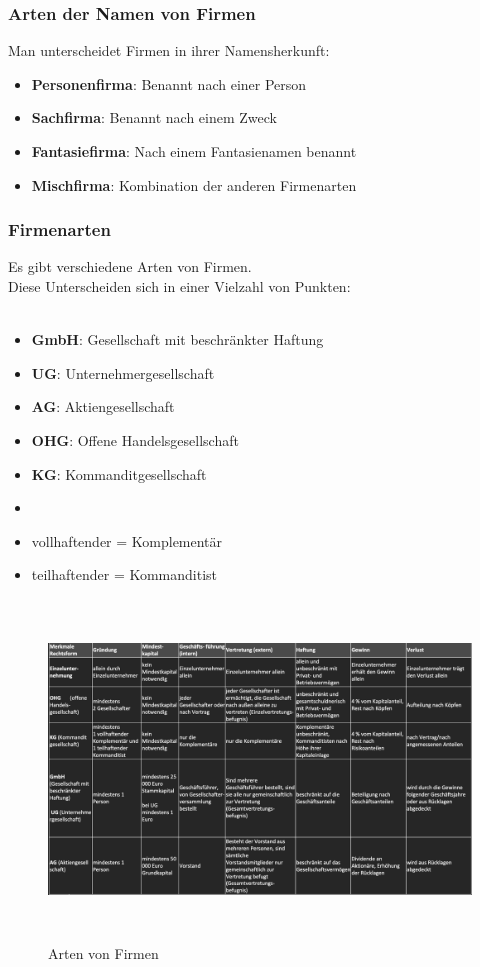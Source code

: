 \documentclass[10pt]{article}
\begin{document}
\subsubsection{Arten der Namen von Firmen}
Man unterscheidet Firmen in ihrer Namensherkunft:
\begin{itemize}
\item \textbf{Personenfirma}: Benannt nach einer Person
\item \textbf{Sachfirma}: Benannt nach einem Zweck
\item \textbf{Fantasiefirma}: Nach einem Fantasienamen benannt
\item \textbf{Mischfirma}: Kombination der anderen Firmenarten
\end{itemize}

\subsubsection{Firmenarten}
Es gibt verschiedene Arten von Firmen. \\
Diese Unterscheiden sich in einer Vielzahl von Punkten: \\ \\

\begin{itemize}
\item \textbf{GmbH}: Gesellschaft mit beschr\"ankter Haftung
\item \textbf{UG}: Unternehmergesellschaft
\item \textbf{AG}: Aktiengesellschaft
\item \textbf{OHG}: Offene Handelsgesellschaft
\item \textbf{KG}: Kommanditgesellschaft
\item[]
\item vollhaftender = Komplement\"ar
\item teilhaftender = Kommanditist
\end{itemize}

\begin{figure}[H]
\begin{center}
  \includegraphics[height=9cm]{arten.png}
\end{center}
  \caption{Arten von Firmen}
  \label{fig: Arten von Firmen}
\end{figure}
\end{document}
